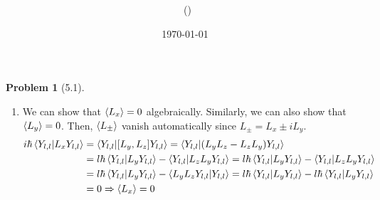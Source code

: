 \documentclass[twoside,11pt]{article}
\title{{\lms \Code \ \Ass}}
\author{\lms \name \ (\href{mailto:\mail}{\mail})}
\date{\sffamily \today}
\makeatletter
\theoremstyle{definition}
\newtheorem{problem}{Problem}
\theoremstyle{remark}
\newtheorem*{remark}{Remark}
\renewcommand{\maketitle}{\bgroup\setlength{\parindent}{0pt}
\begin{flushleft}
  \textbf{\Large\@title}

  \@author
\end{flushleft}\egroup
}
\makeatother
\begin{document}
\maketitle
\thispagestyle{title}


\begin{problem}[5.1]\
\begin{enumerate}[label=(\alph*)]
    \item We can show that $\braket{L_x}=0$ algebraically.
    Similarly, we can also show that $\braket{L_y}=0$.
    Then, $\braket{L_{\pm}}$ vanish automatically since $L_{\pm} = L_x \pm i L_y$.
    \begin{align*}
        i\hbar\braket{Y_{l,l}|L_xY_{l,l}}
        &= \braket{Y_{l,l}|[L_y, L_z]Y_{l,l}}
        = \braket{Y_{l,l}|(L_yL_z-L_zL_y)Y_{l,l}} \\
        &= l\hbar \braket{Y_{l,l}|L_y Y_{l,l}} - \braket{Y_{l,l}|L_zL_yY_{l,l}}
        = l\hbar \braket{Y_{l,l}|L_y Y_{l,l}} - \braket{Y_{l,l}|L_zL_yY_{l,l}}\\
        &= l\hbar \braket{Y_{l,l}|L_yY_{l,l}} - \braket{L_yL_zY_{l,l}|Y_{l,l}}
        = l\hbar \braket{Y_{l,l}|L_yY_{l,l}} - l\hbar \braket{Y_{l,l}|L_yY_{l,l}}\\
        &= 0\Rightarrow \braket{L_x}=0
    \end{align*}


\end{enumerate}
\end{problem}
\end{document}
